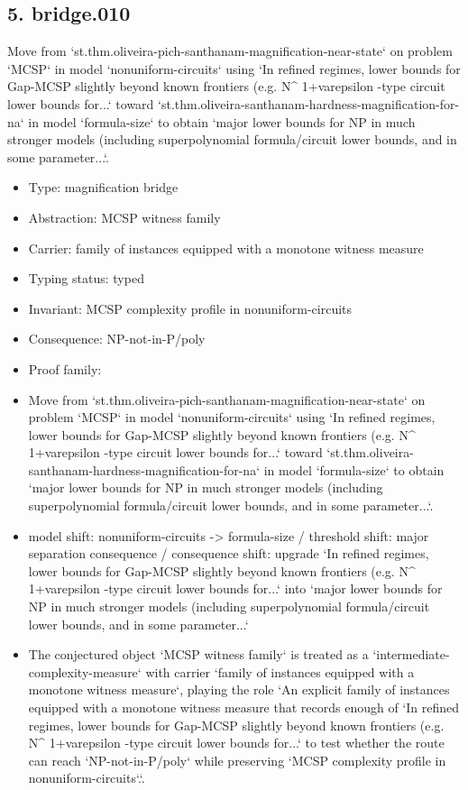 \documentclass[11pt]{article}
\begin{document}
\subsection*{5. bridge.010}
Move from `st.thm.oliveira-pich-santhanam-magnification-near-state` on problem `MCSP` in model `nonuniform-circuits` using `In refined regimes, lower bounds for Gap-MCSP slightly beyond known frontiers (e.g. N\textasciicircum{} 1+varepsilon -type circuit lower bounds for...` toward `st.thm.oliveira-santhanam-hardness-magnification-for-na` in model `formula-size` to obtain `major lower bounds for NP in much stronger models (including superpolynomial formula/circuit lower bounds, and in some parameter...`.
\begin{itemize}
\item Type: magnification bridge
\item Abstraction: MCSP witness family
\item Carrier: family of instances equipped with a monotone witness measure
\item Typing status: typed
\item Invariant: MCSP complexity profile in nonuniform-circuits
\item Consequence: NP-not-in-P/poly
\item Proof family: 
\item Move from `st.thm.oliveira-pich-santhanam-magnification-near-state` on problem `MCSP` in model `nonuniform-circuits` using `In refined regimes, lower bounds for Gap-MCSP slightly beyond known frontiers (e.g. N\textasciicircum{} 1+varepsilon -type circuit lower bounds for...` toward `st.thm.oliveira-santhanam-hardness-magnification-for-na` in model `formula-size` to obtain `major lower bounds for NP in much stronger models (including superpolynomial formula/circuit lower bounds, and in some parameter...`.
\item model shift: nonuniform-circuits -> formula-size / threshold shift: major separation consequence / consequence shift: upgrade `In refined regimes, lower bounds for Gap-MCSP slightly beyond known frontiers (e.g. N\textasciicircum{} 1+varepsilon -type circuit lower bounds for...` into `major lower bounds for NP in much stronger models (including superpolynomial formula/circuit lower bounds, and in some parameter...`
\item The conjectured object `MCSP witness family` is treated as a `intermediate-complexity-measure` with carrier `family of instances equipped with a monotone witness measure`, playing the role `An explicit family of instances equipped with a monotone witness measure that records enough of `In refined regimes, lower bounds for Gap-MCSP slightly beyond known frontiers (e.g. N\textasciicircum{} 1+varepsilon -type circuit lower bounds for...` to test whether the route can reach `NP-not-in-P/poly` while preserving `MCSP complexity profile in nonuniform-circuits`.`.

\end{itemize}
\end{document}

